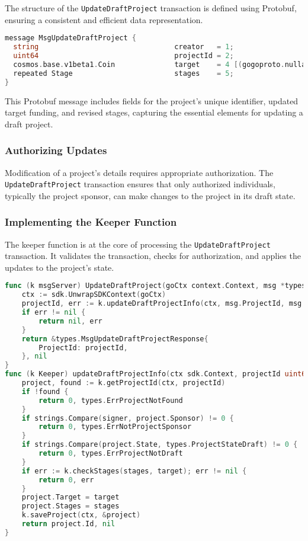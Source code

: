The structure of the \texttt{UpdateDraftProject} transaction is defined using Protobuf, ensuring a consistent and efficient data representation.

\newpage
\begin{lstlisting}[language=go, caption=UpdateDraftProject protobuf definition, label={lst:update_draft_project_proto}]
message MsgUpdateDraftProject {
  string                                creator   = 1;
  uint64                                projectId = 2;
  cosmos.base.v1beta1.Coin              target    = 4 [(gogoproto.nullable) = false];
  repeated Stage                        stages    = 5;
}
\end{lstlisting}

This Protobuf message includes fields for the project's unique identifier, updated target funding, and revised stages, capturing the essential elements for updating a draft project.

\subsubsection{Authorizing Updates}
\label{subsubsec:authorizing-updates}

Modification of a project's details requires appropriate authorization. The \texttt{UpdateDraftProject} transaction ensures that only authorized individuals, typically the project sponsor, can make changes to the project in its draft state.

\subsubsection{Implementing the Keeper Function}
\label{subsubsec:keeper-update-draft}

The keeper function is at the core of processing the \texttt{UpdateDraftProject} transaction. It validates the transaction, checks for authorization, and applies the updates to the project's state.

\begin{lstlisting}[language=go, caption=Keeper implementation for UpdateDraftProject, label={lst:keeper-update-draft}]
func (k msgServer) UpdateDraftProject(goCtx context.Context, msg *types.MsgUpdateDraftProject) (*types.MsgUpdateDraftProjectResponse, error) {
	ctx := sdk.UnwrapSDKContext(goCtx)
	projectId, err := k.updateDraftProjectInfo(ctx, msg.ProjectId, msg.Target, msg.Stages, msg.Creator)
	if err != nil {
		return nil, err
	}
	return &types.MsgUpdateDraftProjectResponse{
		ProjectId: projectId,
	}, nil
}
func (k Keeper) updateDraftProjectInfo(ctx sdk.Context, projectId uint64, target sdk.Coin, stages []*types.Stage, signer string) (uint64, error) {
	project, found := k.getProjectId(ctx, projectId)
	if !found {
		return 0, types.ErrProjectNotFound
	}
	if strings.Compare(signer, project.Sponsor) != 0 {
		return 0, types.ErrNotProjectSponsor
	}
	if strings.Compare(project.State, types.ProjectStateDraft) != 0 {
		return 0, types.ErrProjectNotDraft
	}
	if err := k.checkStages(stages, target); err != nil {
		return 0, err
	}
	project.Target = target
	project.Stages = stages
	k.saveProject(ctx, &project)
	return project.Id, nil
}
\end{lstlisting}

